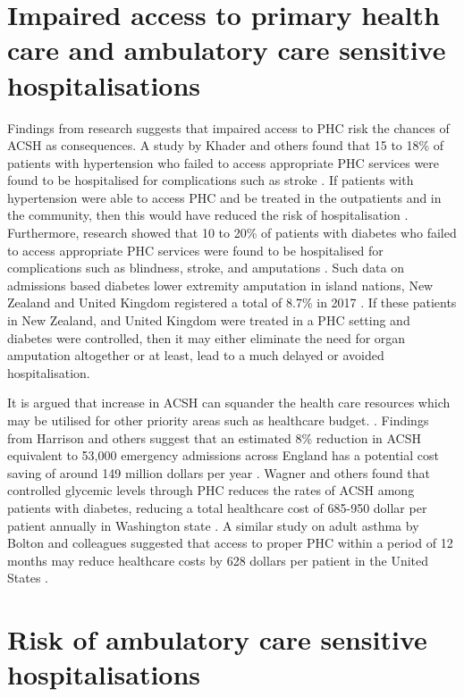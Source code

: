 \section{Impaired access to primary health care and ambulatory care sensitive hospitalisations}

Findings from research suggests that impaired access to PHC risk the chances of ACSH as consequences. A study by Khader and others found that 15 to 18\% of patients with hypertension who failed to access appropriate PHC services were found to be hospitalised for complications such as stroke \cite{khader2012cohort1}. If patients with hypertension were able to access PHC and be treated in the outpatients and in the community, then this would have reduced the risk of hospitalisation \cite{ansari2012patient,ansari2006access,laditka2003hospital,bindman1995preventable,billings1993impact,millman1993access}. Furthermore, research showed that 10 to 20\% of patients with diabetes who failed to access appropriate PHC services were found to be hospitalised for complications such as blindness, stroke, and amputations \cite{khader2012cohort}. Such data on admissions based diabetes lower extremity amputation in island nations, New Zealand and United Kingdom registered a total of 8.7\% in 2017 \cite{OECD:Data:countries}. If these patients in New Zealand, and United Kingdom were treated in a PHC setting and diabetes were controlled, then it may either eliminate the need for organ amputation altogether or at least, lead to a much delayed or avoided hospitalisation. 

It is argued that increase in ACSH can squander the health care resources which may be utilised for other priority areas \cite{basu2008systematic,culler1998factors} such as healthcare budget. \cite{bodenheimer2002improving}. Findings from Harrison and others suggest that an estimated 8\% reduction in ACSH equivalent to 53,000 emergency admissions across England has a potential cost saving of around 149 million dollars per year \cite{harrison2014effect}. Wagner and others found that controlled glycemic levels through PHC reduces the rates of ACSH among patients with diabetes, reducing a total healthcare cost of 685-950 dollar per patient annually in Washington state \cite{wagner2001effect}. A similar study on adult asthma by Bolton and colleagues suggested that access to proper PHC within a period of 12 months may reduce healthcare costs by 628 dollars per patient in the United States \cite{greineder1999randomized}.

\section{Risk of ambulatory care sensitive hospitalisations}

